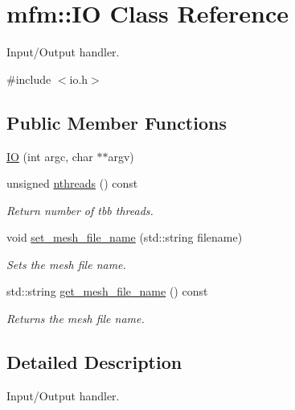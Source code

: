 \hypertarget{classmfm_1_1_i_o}{}\section{mfm\+:\+:IO Class Reference}
\label{classmfm_1_1_i_o}


Input/\+Output handler.  




{\ttfamily \#include $<$io.\+h$>$}

\subsection*{Public Member Functions}
\begin{DoxyCompactItemize}
\item 
\hyperlink{classmfm_1_1_i_o_a8813c2890cd7db53f6f49489c4e91dcf}{IO} (int argc, char $\ast$$\ast$argv)
\item 
\mbox{\label{classmfm_1_1_i_o_ab746424f1465bfc08374004ed6b0760e}} 
unsigned \hyperlink{classmfm_1_1_i_o_ab746424f1465bfc08374004ed6b0760e}{nthreads} () const
\begin{DoxyCompactList}\small\item\em Return number of tbb threads. \end{DoxyCompactList}\item 
\mbox{\label{classmfm_1_1_i_o_a5f98edbe9062abf067d440b4a592e002}} 
void \hyperlink{classmfm_1_1_i_o_a5f98edbe9062abf067d440b4a592e002}{set\+\_\+mesh\+\_\+file\+\_\+name} (std\+::string filename)
\begin{DoxyCompactList}\small\item\em Sets the mesh file name. \end{DoxyCompactList}\item 
\mbox{\label{classmfm_1_1_i_o_a0d6ea2ff1127c76b13bd33f4d300f8e1}} 
std\+::string \hyperlink{classmfm_1_1_i_o_a0d6ea2ff1127c76b13bd33f4d300f8e1}{get\+\_\+mesh\+\_\+file\+\_\+name} () const
\begin{DoxyCompactList}\small\item\em Returns the mesh file name. \end{DoxyCompactList}\end{DoxyCompactItemize}


\subsection{Detailed Description}
Input/\+Output handler. 

